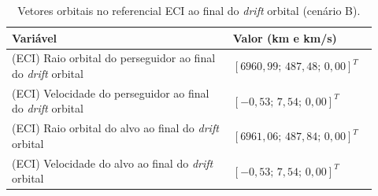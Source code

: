 \begin{table}[H]
\centering
\caption{Vetores orbitais no referencial ECI ao final do \emph{drift} orbital (cenário B).}
\label{tab_cap4_eciB_final}
\begingroup
\small
\setlength{\tabcolsep}{4pt}
\renewcommand{\arraystretch}{1.15}
\begin{tabular}{|p{0.58\linewidth}|p{0.34\linewidth}|}
\hline
Variável & Valor (km e km/s)\\
\hline
(ECI) Raio orbital do perseguidor ao final do \emph{drift} orbital &
$\left[6960,99;\,487,48;\,0,00\right]^T$\\
\hline
(ECI) Velocidade do perseguidor ao final do \emph{drift} orbital &
$\left[-0,53;\,7,54;\,0,00\right]^T$\\
\hline
(ECI) Raio orbital do alvo ao final do \emph{drift} orbital &
$\left[6961,06;\,487,84;\,0,00\right]^T$\\
\hline
(ECI) Velocidade do alvo ao final do \emph{drift} orbital &
$\left[-0,53;\,7,54;\,0,00\right]^T$\\
\hline
\end{tabular}
\endgroup
\end{table}
